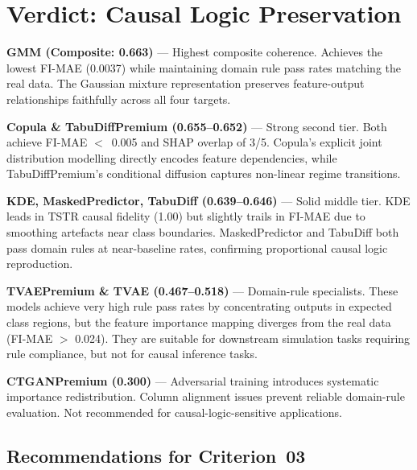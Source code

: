 \documentclass[12pt,a4paper]{article}
\begin{document}
\section{Verdict: Causal Logic Preservation}

\begin{tcolorbox}[successbox, title={Verdict by Model}]
\textbf{GMM (Composite: 0.663)} --- Highest composite coherence. Achieves the lowest FI-MAE (0.0037) while maintaining domain rule pass rates matching the real data. The Gaussian mixture representation preserves feature-output relationships faithfully across all four targets.

\medskip
\textbf{Copula \& TabuDiffPremium (0.655--0.652)} --- Strong second tier. Both achieve FI-MAE $<$~0.005 and SHAP overlap of 3/5. Copula's explicit joint distribution modelling directly encodes feature dependencies, while TabuDiffPremium's conditional diffusion captures non-linear regime transitions.

\medskip
\textbf{KDE, MaskedPredictor, TabuDiff (0.639--0.646)} --- Solid middle tier. KDE leads in TSTR causal fidelity (1.00) but slightly trails in FI-MAE due to smoothing artefacts near class boundaries. MaskedPredictor and TabuDiff both pass domain rules at near-baseline rates, confirming proportional causal logic reproduction.

\medskip
\textbf{TVAEPremium \& TVAE (0.467--0.518)} --- Domain-rule specialists. These models achieve very high rule pass rates by concentrating outputs in expected class regions, but the feature importance mapping diverges from the real data (FI-MAE $>$ 0.024). They are suitable for downstream simulation tasks requiring rule compliance, but not for causal inference tasks.

\medskip
\textbf{CTGANPremium (0.300)} --- Adversarial training introduces systematic importance redistribution. Column alignment issues prevent reliable domain-rule evaluation. Not recommended for causal-logic-sensitive applications.
\end{tcolorbox}

\subsection{Recommendations for Criterion~03}
\end{document}
